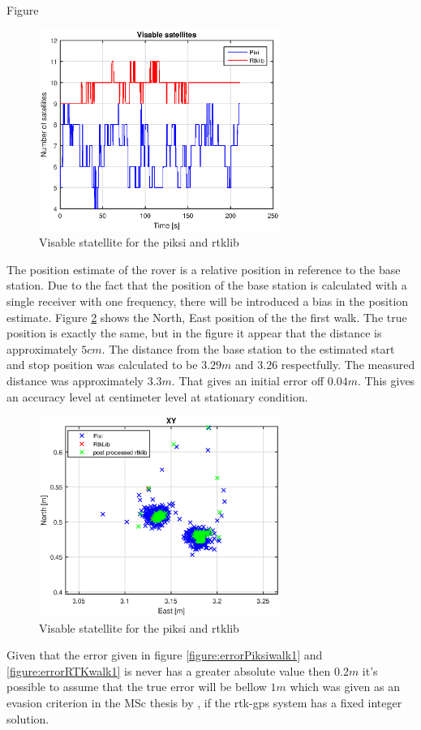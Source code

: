 Figure 
\begin{figure}[H]
	\centering
		\includegraphics[width=0.7\textwidth]{figs/plots/sv.eps}
		\caption{Visable statellite for the piksi and rtklib}
		\label{figure:NumSatWalk1}
\end{figure}
The position estimate of the rover is a relative position in reference to the base station. Due to the fact that the position of the base station is calculated with a single receiver with one frequency, there will be introduced a bias in the position estimate. Figure \ref{figure:enhancedxywalk1} shows the North, East position of the the first walk. The true position is exactly the same, but in the figure it appear that the distance is approximately $5cm$. The distance from the base station to the estimated start and stop position was calculated to be $3.29m$ and $3.26$ respectfully. The measured distance was approximately $3.3m$. That gives an initial error off $0.04m$. This gives an accuracy level at centimeter level at stationary condition. 
\begin{figure}[H]
	\centering
		\includegraphics[width=0.7\textwidth]{figs/plots/enhancedxywalk1.eps}
		\caption{Visable statellite for the piksi and rtklib}
		\label{figure:enhancedxywalk1}
\end{figure}
Given that the error given in figure \ref{figure:errorPiksiwalk1} and \ref{figure:errorRTKwalk1} is never has a greater absolute value then $0.2m$ it's possible to assume that the true error will be bellow $1m$ which was given as an evasion criterion in the MSc thesis by \citep{Froelich}, if the \gls{rtk-gps} system has a fixed integer solution.

